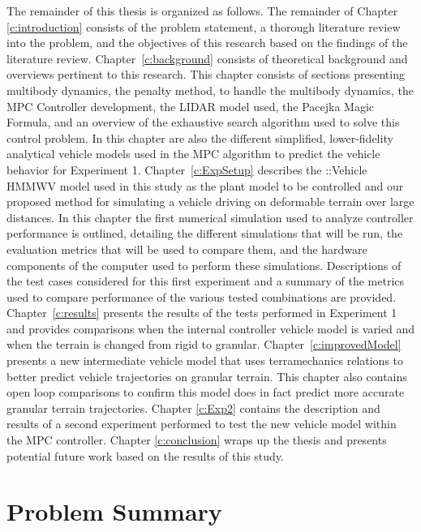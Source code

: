 \documentclass[12pt,onecolumn]{report}
\newcommand{\CHRONO}{{\sffamily{{Chrono}}}}
\newcommand{\ChronoVehicle}{{\sffamily{Chrono}}::Vehicle}
\begin{document}
The remainder of this thesis is organized as follows. The remainder of Chapter \ref{c:introduction} consists of the problem statement, a thorough literature review into the problem, and the objectives of this research based on the findings of the literature review. Chapter~\ref{c:background} consists of theoretical background and overviews pertinent to this research. This chapter consists of sections presenting multibody dynamics, the penalty method, {\CHRONO} to handle the multibody dynamics, the MPC Controller development, the LIDAR model used, the Pacejka Magic Formula, and an overview of the exhaustive search algorithm used to solve this control problem. In this chapter are also the different simplified, lower-fidelity analytical vehicle models used in the MPC algorithm to predict the {\CHRONO} vehicle behavior for Experiment 1. Chapter~\ref{c:ExpSetup} describes the {\ChronoVehicle} HMMWV model used in this study as the plant model to be controlled and our proposed method for simulating a vehicle driving on deformable terrain over large distances. In this chapter the first numerical simulation used to analyze controller performance is outlined, detailing the different simulations that will be run, the evaluation metrics that will be used to compare them, and the hardware components of the computer used to perform these simulations. Descriptions of the test cases considered for this first experiment and a summary of the metrics used to compare performance of the various tested combinations are provided. Chapter~\ref{c:results} presents the results of the tests performed in Experiment 1 and provides comparisons when the internal controller vehicle model is varied and when the terrain is changed from rigid to granular. Chapter~\ref{c:improvedModel} presents a new intermediate vehicle model that uses terramechanics relations to better predict vehicle trajectories on granular terrain. This chapter also contains open loop comparisons to confirm this model does in fact predict more accurate granular terrain trajectories. Chapter \ref{c:Exp2} contains the description and results of a second experiment performed to test the new vehicle model within the MPC controller. Chapter \ref{c:conclusion} wraps up the thesis and presents potential future work based on the results of this study.


\section{Problem Summary}\label{s:ProblemSummary}
\end{document}

